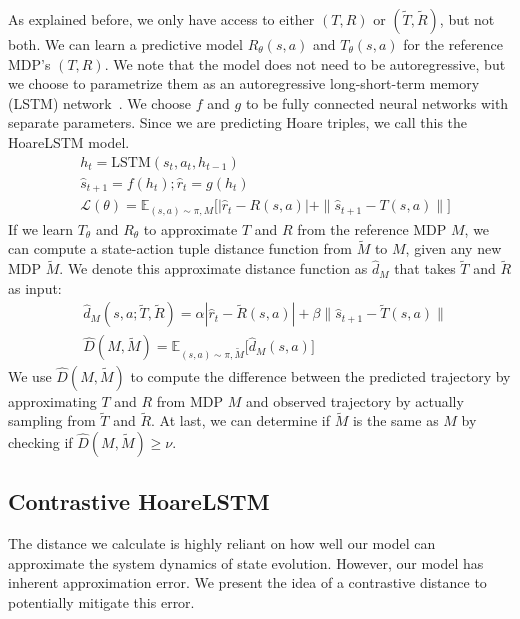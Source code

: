 \documentclass{article}
\newcommand{\E}{\mathbb{E}}
\newcommand{\Ls}{\mathcal{L}}
\begin{document}
As explained before, we only have access to either $(T, R)$ or $(\tilde T, \tilde R)$, but not both. We can learn a predictive model $R_\theta(s, a)$ and $T_\theta(s, a)$ for the reference MDP's $(T, R)$. We note that the model does not need to be autoregressive, but we choose to parametrize them as an autoregressive long-short-term memory (LSTM) network~\cite{hochreiter1997long}. We choose $f$ and $g$ to be fully connected neural networks with separate parameters. Since we are predicting Hoare triples, we call this the HoareLSTM model.
\begin{align}
    &h_t = \text{LSTM}(s_t, a_t, h_{t-1}) \\
    &\hat s_{t+1} = f(h_t); \hat r_{t} = g(h_t) \\
    &\Ls(\theta) = \E_{(s, a) \sim \pi, M} \big[ | \hat r_t - R(s, a) | + \| \hat s_{t+1} - T(s, a) \| \big]
\end{align}
If we learn $T_\theta$ and $R_\theta$ to approximate $T$ and $R$ from the reference MDP $M$, we can compute a state-action tuple distance function from $\tilde M$ to $M$, given any new MDP $\tilde M$. We denote this approximate distance function as $\hat d_M$ that takes $\tilde T$ and $\tilde R$ as input:
\begin{align}
    &\hat d_M(s, a; \tilde T, \tilde R) = \alpha | \hat r_t - \tilde R(s, a) | + \beta \| \hat s_{t+1} - \tilde T(s, a) \|  \label{eq:approx_dist} \\
    &\hat D(M, \tilde M) = \E_{(s, a) \sim \pi, \tilde M} \big[ \hat d_M(s, a) \big] \label{eq:hoarelstm_mdp_dist}
\end{align}
We use $\hat D(M, \tilde M)$ to compute the difference between the predicted trajectory by approximating $T$ and $R$ from MDP $M$ and observed trajectory by actually sampling from $\tilde T$ and $\tilde R$. At last, we can determine if $\tilde M$ is the same as $M$ by checking if $\hat D(M, \tilde M) \geq \nu$.


\subsection{Contrastive HoareLSTM}
\label{sec:con_hoarelstm}
\vspace{-2mm} 



The distance we calculate is highly reliant on how well our model can approximate the system dynamics of state evolution. However, our model has inherent approximation error. We present the idea of a contrastive distance to potentially mitigate this error.
\end{document}
